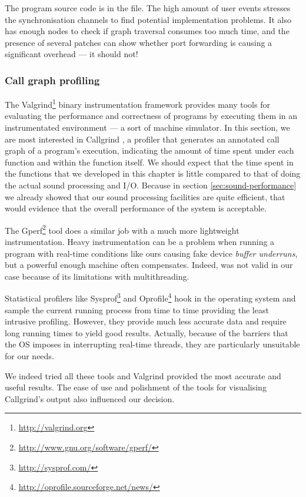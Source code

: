 The program source code is in the
 file. The high amount of user
events stresses the synchronisation channels to find potential
implementation problems. It also has enough nodes to check if graph
traversal consumes too much time, and the presence of several patches
can show whether port forwarding is causing a significant overhead ---
it should not!

\subsubsection{Call graph profiling}

The Valgrind\footnote{\url{http://valgrind.org}}
\cite{nethercote07valgrind} binary instrumentation
framework provides many tools for evaluating the performance and
correctness of programs by executing them in an instrumentated
environment --- a sort of machine simulator. In this section, we are
most interested in Callgrind \cite{weidendorfer04callgrind}, a
 profiler that generates an 
annotated call graph of a program's execution, indicating the amount
of time spent under each function and within the function itself. We
should expect that the time spent in the functions that we developed
in this chapter is little compared to that of doing the actual sound
processing and I/O. Because in section \ref{sec:sound-performance} we
already showed that our sound processing facilities are quite
efficient, that would evidence that the overall performance of the
system is acceptable.

\begin{mynote}
  The Gperf\footnote{\url{http://www.gnu.org/software/gperf/}} tool
  does a similar job with a much more lightweight
  instrumentation. Heavy instrumentation can be a problem when running
  a program with real-time conditions like ours causing fake device
  \emph{buffer underruns}, but a powerful enough
  machine often compensates. Indeed,  was not valid in our
  case because of its limitations with multithreading.

  Statistical profilers like
  Sysprof\footnote{\url{http://sysprof.com/}} and
  Oprofile\footnote{\url{http://oprofile.sourceforge.net/news/}} hook
  in the operating system and sample the current running process from
  time to time providing the least intrusive profiling. However, they
  provide much less accurate data and require long running times to
  yield good results. Actually, because of the barriers that the OS
  imposes in interrupting real-time threads, they are particularly
  unsuitable for our needs.

  We indeed tried all these tools and Valgrind provided the most
  accurate and useful results. The ease of use and polishment of the
  tools for visualising Callgrind's output also influenced our
  decision.
\end{mynote}

